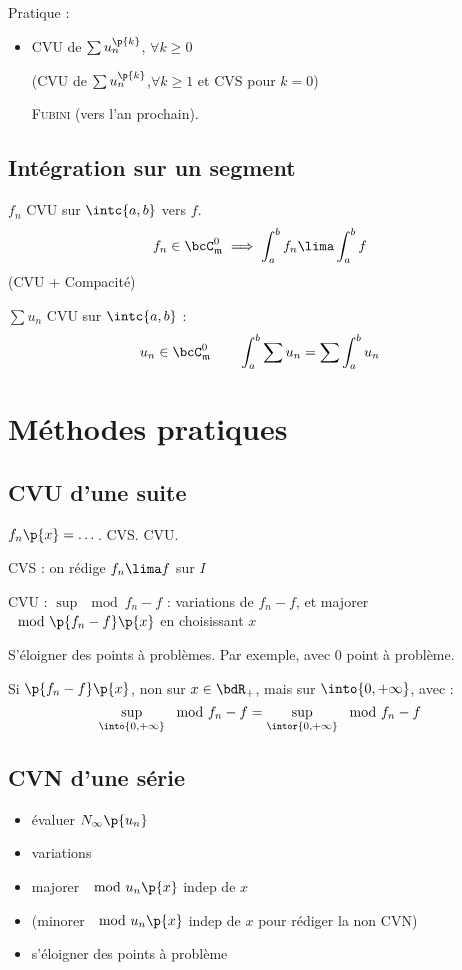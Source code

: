 \documentclass[a4paper,french,bookmarks]{book}
\begin{document}
    Pratique :
    \begin{itemize}
        \item CVU de $\sum u_n^{\p{k}}$, \qquad $\forall k \geq 0$
        
        (CVU de $\sum u_n^{\p{k}}$,\qquad $\forall k \geq 1$ et CVS pour $k = 0$)
        
        \itstar \textsc{Fubini} (vers l'an prochain).
    \end{itemize}
    
    \subsection{Intégration sur un segment}
    
    $f_n$ CVU sur $\intc{a, b}$ vers $f$.
    \[ f_n \in \bcC^0_{\mathfrak{m}} \implies \int_a^b f_n \lima \int_a^b f\]
    (CVU + Compacité)\medskip
    
    
    $\sum u_n$ CVU sur $\intc{a, b}$ :
    \[ u_n \in \bcC^0_{\mathfrak{m}} \qquad \int_a^b \sum u_n = \sum \int_a^b u_n\]
    
    \section{Méthodes pratiques}
    
    \subsection{CVU d'une suite}
    $f_n\p{x} = \dots$. CVS. CVU.
    
    CVS : on rédige $f_n \lima f$ sur $I$
    
    CVU : $\sup \mod{f_n - f}$ : variations de $f_n - f$, et majorer $\mod{\p{f_n - f}\p{x}}$ en choisissant $x$\medskip
    
    S'éloigner des points à problèmes. Par exemple, avec $0$ point à problème.
    
    Si $\p{f_n - f}\p{x}$, non sur $x \in \bdR_+$, mais sur $\into{0, +\infty}$, avec :
    \[ \sup\limits_{\into{0, +\infty}} \mod{f_n - f} = \sup\limits_{\intor{0, +\infty}} \mod{f_n - f}\]
    
    \subsection{CVN d'une série}
    
    \begin{itemize}
        \item évaluer $N_\infty\p{u_n}$
        
        \item variations
        
        \item majorer $\mod{u_n\p{x}}$ indep de $x$
        
        \item (minorer $\mod{u_n\p{x}}$ indep de $x$ pour rédiger la non CVN)
        
        \item s'éloigner des points à problème
    \end{itemize}
    
\end{document}
